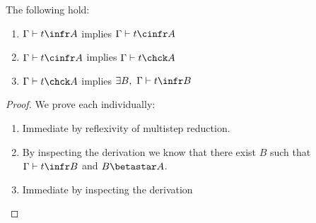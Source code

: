 
\begin{lemma}
    The following hold:
    \begin{enumerate}
        \item $\Gamma \vdash t \infr A$ implies $\Gamma \vdash t \cinfr A$
        \item $\Gamma \vdash t \cinfr A$ implies $\Gamma \vdash t \chck A$
        \item $\Gamma \vdash t \chck A$ implies $\exists B,\ \Gamma \vdash t \infr B$
    \end{enumerate}
\end{lemma}
\begin{proof}
    We prove each individually:
    \begin{enumerate}
        \item Immediate by reflexivity of multistep reduction.
        \item {
            By inspecting the derivation we know that there exist $B$ such that $\Gamma \vdash t \infr B$ and $B \betastar A$.
        }
        \item Immediate by inspecting the derivation
    \end{enumerate}
\end{proof}

